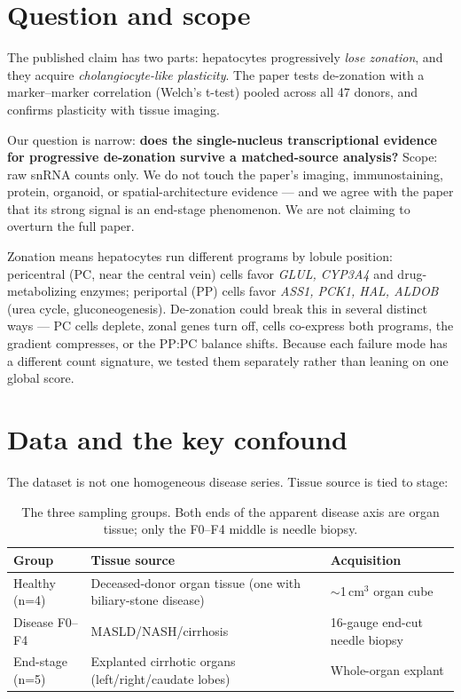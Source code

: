 \documentclass[11pt,a4paper]{article}
\begin{document}
\setcounter{tocdepth}{2}
\begingroup\renewcommand{\contentsname}{\normalsize Contents}{\small\tableofcontents}\endgroup
\vspace{0.6em}

\section{Question and scope}

The published claim has two parts: hepatocytes progressively \emph{lose zonation}, and they acquire \emph{cholangiocyte-like plasticity}. The paper tests de-zonation with a marker--marker correlation (Welch's t-test) pooled across all 47 donors, and confirms plasticity with tissue imaging.

Our question is narrow: \textbf{does the single-nucleus transcriptional evidence for progressive de-zonation survive a matched-source analysis?} Scope: raw snRNA counts only. We do not touch the paper's imaging, immunostaining, protein, organoid, or spatial-architecture evidence --- and we agree with the paper that its strong signal is an end-stage phenomenon. We are not claiming to overturn the full paper.

Zonation means hepatocytes run different programs by lobule position: pericentral (PC, near the central vein) cells favor \emph{GLUL, CYP3A4} and drug-metabolizing enzymes; periportal (PP) cells favor \emph{ASS1, PCK1, HAL, ALDOB} (urea cycle, gluconeogenesis). De-zonation could break this in several distinct ways --- PC cells deplete, zonal genes turn off, cells co-express both programs, the gradient compresses, or the PP:PC balance shifts. Because each failure mode has a different count signature, we tested them separately rather than leaning on one global score.

\section{Data and the key confound}

The dataset is not one homogeneous disease series. Tissue source is tied to stage:

\begin{table}[H]
\centering
\small
\begin{tabular}{lll}
\toprule
Group & Tissue source & Acquisition \\
\midrule
Healthy (n=4) & Deceased-donor organ tissue (one with biliary-stone disease) & $\sim$1\,cm$^3$ organ cube \\
Disease F0--F4 & MASLD/NASH/cirrhosis & 16-gauge end-cut needle biopsy \\
End-stage (n=5) & Explanted cirrhotic organs (left/right/caudate lobes) & Whole-organ explant \\
\bottomrule
\end{tabular}
\caption{The three sampling groups. Both ends of the apparent disease axis are organ tissue; only the F0--F4 middle is needle biopsy.}
\label{tab:groups}
\end{table}
\end{document}

